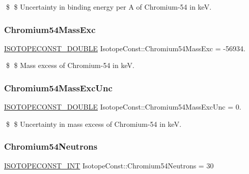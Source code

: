 \$ \$ Uncertainty in binding energy per A of Chromium-\/54 in keV. \mbox{\label{group___isotope_const-_chromium-_cr54_gaa6339b158fad84355a8668620f8dca90}} 
\subsubsection{\texorpdfstring{Chromium54\+Mass\+Exc}{Chromium54MassExc}}
{\footnotesize\ttfamily \mbox{\hyperlink{group___isotope_const-_macros_ga8f45a7272ce02c0b4c65c44636ed719a}{I\+S\+O\+T\+O\+P\+E\+C\+O\+N\+S\+T\+\_\+\+D\+O\+U\+B\+LE}} Isotope\+Const\+::\+Chromium54\+Mass\+Exc = -\/56934.}

\$ \$ Mass excess of Chromium-\/54 in keV. \mbox{\label{group___isotope_const-_chromium-_cr54_gac273ba2ebed61747abb199a95aaa24c3}} 
\subsubsection{\texorpdfstring{Chromium54\+Mass\+Exc\+Unc}{Chromium54MassExcUnc}}
{\footnotesize\ttfamily \mbox{\hyperlink{group___isotope_const-_macros_ga8f45a7272ce02c0b4c65c44636ed719a}{I\+S\+O\+T\+O\+P\+E\+C\+O\+N\+S\+T\+\_\+\+D\+O\+U\+B\+LE}} Isotope\+Const\+::\+Chromium54\+Mass\+Exc\+Unc = 0.}

\$ \$ Uncertainty in mass excess of Chromium-\/54 in keV. \mbox{\label{group___isotope_const-_chromium-_cr54_ga099713af6b366e7b7a0bfcb2ed739844}} 
\subsubsection{\texorpdfstring{Chromium54\+Neutrons}{Chromium54Neutrons}}
{\footnotesize\ttfamily \mbox{\hyperlink{group___isotope_const-_macros_ga5f18360b3e99483a35c32d789e62621c}{I\+S\+O\+T\+O\+P\+E\+C\+O\+N\+S\+T\+\_\+\+I\+NT}} Isotope\+Const\+::\+Chromium54\+Neutrons = 30}

